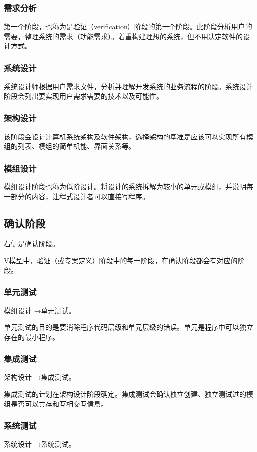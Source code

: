 \documentclass[11pt]{article}
\begin{document}
\subsubsection{需求分析}
\label{sec:org688029c}
第一个阶段，也称为是验证（verification）阶段的第一个阶段。此阶段分析用户的需要，整理系统的需求（功能需求）。着重构建理想的系统，但不用决定软件的设计方式。
\subsubsection{系统设计}
\label{sec:orga5ae7c2}
系统设计师根据用户需求文件，分析并理解开发系统的业务流程的阶段。系统设计阶段会列出要实现用户需求需要的技术以及可能性。
\subsubsection{架构设计}
\label{sec:org9a5bb05}
该阶段会设计计算机系统架构及软件架构，选择架构的基准是应该可以实现所有模组的列表、模组的简单机能、界面关系等。
\subsubsection{模组设计}
\label{sec:orgc4dd794}
模组设计阶段也称为低阶设计。将设计的系统拆解为较小的单元或模组，并说明每一部分的内容，让程式设计者可以直接写程序。
\subsection{确认阶段}
\label{sec:orgbd80baf}
右侧是确认阶段。

V模型中，验证（或专案定义）阶段中的每一阶段，在确认阶段都会有对应的阶段。
\subsubsection{单元测试}
\label{sec:orgf9977a7}
模组设计 →单元测试。

单元测试的目的是要消除程序代码层级和单元层级的错误。单元是程序中可以独立存在的最小程序。
\subsubsection{集成测试}
\label{sec:org400f6a3}
架构设计 →集成测试。

集成测试的计划在架构设计阶段确定。集成测试会确认独立创建、独立测试过的模组是否可以共存和互相交互信息。
\subsubsection{系统测试}
\label{sec:orgabe4814}
系统设计 →系统测试。
\end{document}
